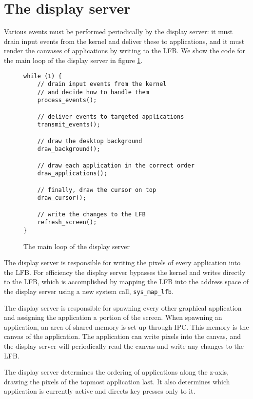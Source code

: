 \documentclass{report}
\begin{document}
\section{The display server}
Various events must be performed periodically by the display server: it must
drain input events from the kernel and deliver these to applications, and it
must render the canvases of applications by writing to the LFB. We show the
code for the main loop of the display server in figure \ref{displayserver}.
\begin{figure}[h]
\begin{framed}
\begin{Verbatim}[fontsize=\small]
while (1) {
	// drain input events from the kernel 
	// and decide how to handle them
	process_events();

	// deliver events to targeted applications
	transmit_events();

	// draw the desktop background
	draw_background();

	// draw each application in the correct order
	draw_applications();

	// finally, draw the cursor on top
	draw_cursor();
	
	// write the changes to the LFB
	refresh_screen();
}
\end{Verbatim}
\end{framed}
\caption{The main loop of the display server}
\label{displayserver}
\end{figure}

The display server is responsible for writing the pixels of every application
into the LFB. For efficiency the display server bypasses the kernel and writes
directly to the LFB, which is accomplished by mapping the LFB into the address
space of the display server using a new system call, \texttt{sys\_map\_lfb}.

The display server is responsible for spawning every other graphical
application and assigning the application a portion of the screen. When
spawning an application, an area of shared memory is set up through IPC.
This memory is the canvas of the application. The application can write pixels
into the canvas, and the display server will periodically read the canvas and
write any changes to the LFB. 

The display server determines the ordering of applications along the z-axis,
drawing the pixels of the topmost application last. It also determines which
application is currently active and directs key presses only to it.
\end{document}
